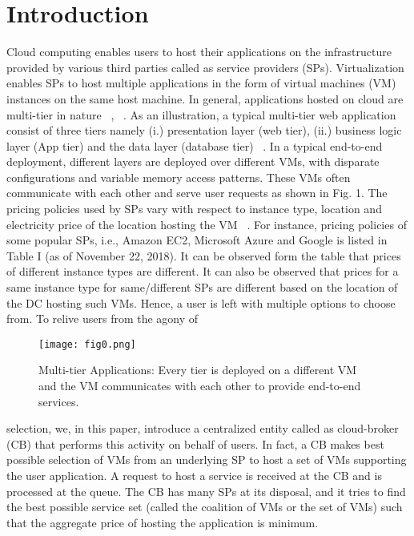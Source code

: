 \documentclass[12pt,a4paper,twoside,openright]{report}
\newcommand\tab[1][0.8cm]{\hspace*{#1}}
\begin{document}
\chapter{Introduction}\label{ch:ch1}
\tab Cloud computing enables users to host their applications
on the infrastructure provided by various third parties called
as service providers (SPs). Virtualization enables SPs to host
multiple applications in the form of virtual machines (VM)
instances on the same host machine. In general, applications
hosted on cloud are multi-tier in nature ~\cite{b1}, ~\cite{b2}. As an
illustration, a typical multi-tier web application consist of three
tiers namely (i.) presentation layer (web tier), (ii.) business
logic layer (App tier) and the data layer (database tier) ~\cite{b3}. In
a typical end-to-end deployment, different layers are deployed
over different VMs, with disparate configurations and variable
memory access patterns. These VMs often communicate with
each other and serve user requests as shown in Fig. 1.\newline
\tab
The pricing policies used by SPs vary with respect to
instance type, location and electricity price of the location
hosting the VM ~\cite{b4}. For instance, pricing policies of some
popular SPs, i.e., Amazon EC2, Microsoft Azure and Google
is listed in Table I (as of November 22, 2018). It can be
observed form the table that prices of different instance types
are different. It can also be observed that prices for a same
instance type for same/different SPs are different based on the
location of the DC hosting such VMs. Hence, a user is left
with multiple options to choose from. To relive users from the agony of 
\begin{figure}[htbp]
	\centerline{\texttt{[image: fig0.png]}}
	\caption{Multi-tier Applications: Every tier is deployed on a different VM and
		the VM communicates with each other to provide end-to-end services.}
	\label{fig}
\end{figure}
selection, we, in this paper, introduce a centralized
entity called as cloud-broker (CB) that performs this activity
on behalf of users. In fact, a CB makes best possible selection
of VMs from an underlying SP to host a set of VMs supporting
the user application. A request to host a service is received at
the CB and is processed at the queue. The CB has many SPs
at its disposal, and it tries to find the best possible service set
(called the coalition of VMs or the set of VMs) such that the
aggregate price of hosting the application is minimum.
\newline
\end{document}
